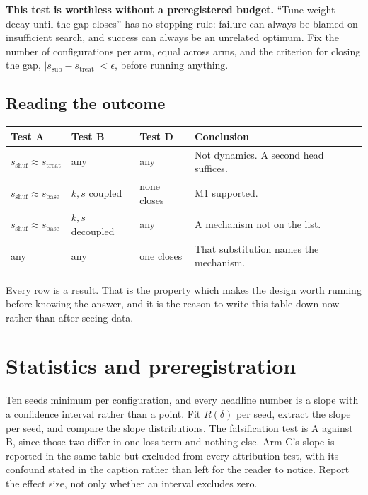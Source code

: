 \documentclass[9pt]{extarticle}
\begin{document}
\textbf{This test is worthless without a preregistered budget.} ``Tune weight decay until the gap closes'' has no stopping rule: failure can always be blamed on insufficient search, and success can always be an unrelated optimum. Fix the number of configurations per arm, equal across arms, and the criterion for closing the gap, $|s_{\text{sub}} - s_{\text{treat}}| < \epsilon$, before running anything.

\subsection{Reading the outcome}

\begin{center}
\footnotesize
\begin{tabular}{@{}p{3.3cm} p{3.3cm} p{2.6cm} p{6.4cm}@{}}
\toprule
Test A & Test B & Test D & Conclusion \\
\midrule
$s_{\text{shuf}} \approx s_{\text{treat}}$ & any & any & Not dynamics. A second head suffices. \\
$s_{\text{shuf}} \approx s_{\text{base}}$ & $k, s$ coupled & none closes & M1 supported. \\
$s_{\text{shuf}} \approx s_{\text{base}}$ & $k, s$ decoupled & any & A mechanism not on the list. \\
any & any & one closes & That substitution names the mechanism. \\
\bottomrule
\end{tabular}
\end{center}

Every row is a result. That is the property which makes the design worth running before knowing the answer, and it is the reason to write this table down now rather than after seeing data.

\section{Statistics and preregistration}

Ten seeds minimum per configuration, and every headline number is a slope with a confidence interval rather than a point. Fit $R(\delta)$ per seed, extract the slope per seed, and compare the slope distributions. The falsification test is A against B, since those two differ in one loss term and nothing else. Arm C's slope is reported in the same table but excluded from every attribution test, with its confound stated in the caption rather than left for the reader to notice. Report the effect size, not only whether an interval excludes zero.
\end{document}

